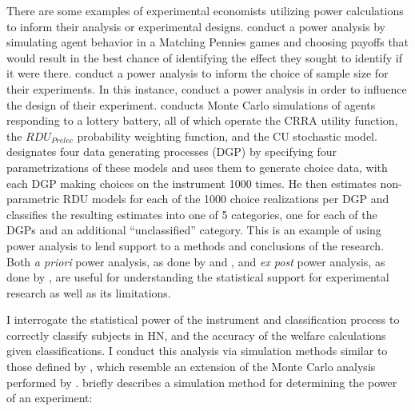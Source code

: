 \documentclass[../main.tex]{subfiles}
\begin{document}
\addtocounter{footnote}{-1}


There are some examples of experimental economists utilizing power calculations to inform their analysis or experimental designs.
\textcite{Rutstrom2009} conduct a power analysis by simulating agent behavior in a Matching Pennies games and choosing payoffs that would result in the best chance of identifying the effect they sought to identify if it were there.
\textcite[2]{Brown2016} conduct a power analysis to inform the choice of sample size for their experiments.
In this instance, \textcite{Rutstrom2009} conduct a power analysis in order to influence the design of their experiment.
\textcite[8]{Wilcox2015} conducts Monte Carlo simulations of agents responding to a lottery battery, all of which operate the CRRA utility function, the $\mathit{RDU_{Prelec}}$ probability weighting function, and the CU stochastic model.
\textcite{Wilcox2015} designates four data generating processes (DGP) by specifying four parametrizations of these models and uses them to generate choice data, with each DGP making choices on the instrument 1000 times.
He then estimates non-parametric RDU models for each of the 1000 choice realizations per DGP and classifies the resulting estimates into one of 5 categories, one for each of the DGPs and an additional \enquote{unclassified} category.
This is an example of using power analysis to lend support to a methods and conclusions of the research.
Both \textit{a priori} power analysis, as done by \textcite{Rutstrom2009} and \textcite{Brown2016}, and \textit{ex post} power analysis, as done by \textcite{Wilcox2015}, are useful for understanding the statistical support for experimental research as well as its limitations.

I interrogate the statistical power of the instrument and classification process to correctly classify subjects in HN, and the accuracy of the welfare calculations given classifications.
I conduct this analysis via simulation methods similar to those defined by \textcite{Feiveson2002}, which resemble an extension of the Monte Carlo analysis performed by \textcite{Wilcox2015}.
\textcite[108]{Feiveson2002} briefly describes a simulation method for determining the power of an experiment:
\end{document}
